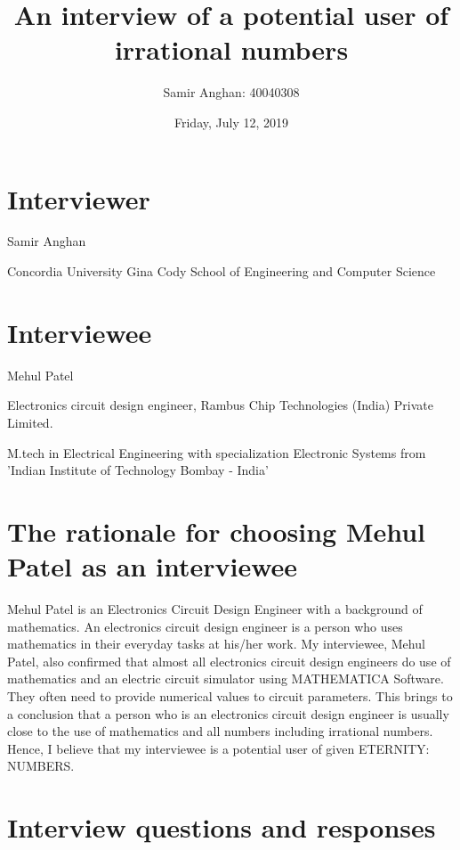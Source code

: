 \documentclass[12pt, letterpaper]{article}
\title{An interview of a potential user of irrational numbers}
\author{Samir Anghan: 40040308}
\date{Friday, July 12, 2019}
\begin{document}
\maketitle

\section{Interviewer}
Samir Anghan\par
Concordia University Gina Cody School of Engineering and Computer Science\par

\section{Interviewee}
Mehul Patel\par
Electronics circuit design engineer, Rambus Chip Technologies (India) Private Limited.\par
M.tech in Electrical Engineering with specialization Electronic Systems from 'Indian Institute of Technology Bombay - India'\par

\section{The rationale for choosing Mehul Patel as an interviewee}

\begin{justify}
Mehul Patel is an Electronics Circuit Design Engineer with a background of mathematics. An electronics circuit design engineer is a person who uses mathematics in their everyday tasks at his/her work. My interviewee, Mehul Patel, also confirmed that almost all electronics circuit design engineers do use of mathematics and an electric circuit simulator using MATHEMATICA Software. They often need to provide numerical values to circuit parameters. This brings to a conclusion that a person who is an electronics circuit design engineer is usually close to the use of mathematics and all numbers including irrational numbers. Hence, I believe that my interviewee is a potential user of given ETERNITY: NUMBERS.
\end{justify}\par


\section{Interview questions and responses}
\end{document}
